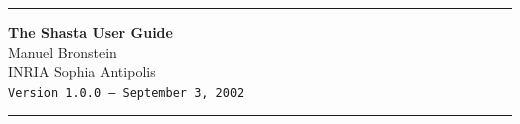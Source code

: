 % 
% 
% 
% 
% 
\thispagestyle{empty}
\begin{center}
\vskip 5cm
\hrule
\vskip 5mm
{\LARGE\bf The Shasta User Guide}\\
\vskip 5mm
{\Large Manuel Bronstein}\\
\vskip 2mm
{\Large INRIA Sophia Antipolis}\\
\vskip 2mm
{\Large\tt Version 1.0.0 -- September 3, 2002}
\vskip 0.5cm
\hrule
\vskip 2cm
\begin{figure}[ht]
\begin{center}
\end{center}
\end{figure}
\par\noindent
\end{center}

